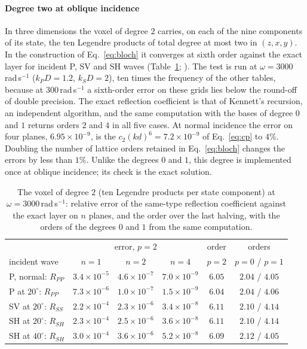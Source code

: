 \documentclass[preprint,review,12pt]{elsarticle}
\begin{document}
\paragraph{Degree two at oblique incidence} In three dimensions the voxel of degree $2$ carries, on each
of the nine components of its state, the ten Legendre products of total degree at most two in
$(z,x,y)$. In the construction of Eq.~\eqref{eq:bloch} it converges at sixth order against the exact
layer for incident P, SV and SH waves (Table~\ref{tab:deg2}; ).
The test is run at $\omega=3000$\,rad\,s$^{-1}$ ($k_PD=1.2$, $k_SD=2$), ten times the frequency of the
other tables, because at $300$\,rad\,s$^{-1}$ a sixth-order error on these grids lies below the round-off
of double precision. The exact reflection coefficient is that of Kennett's recursion, an independent
algorithm, and the same computation with the bases of degree $0$ and $1$ returns orders $2$ and $4$ in
all five cases. At normal incidence the error on four planes, $6.95\times10^{-9}$, is the
$c_2(kd)^6=7.2\times10^{-9}$ of Eq.~\eqref{eq:cp} to $4\%$. Doubling the number of lattice orders retained
in Eq.~\eqref{eq:bloch} changes the errors by less than $1\%$. Unlike the degrees $0$ and $1$, this degree
is implemented once at oblique incidence; its check is the exact solution.
\begin{table}[htbp]
\centering
\caption{The voxel of degree $2$ (ten Legendre products per state component) at
$\omega=3000$\,rad\,s$^{-1}$: relative error of the same-type reflection coefficient against the exact
layer on $n$ planes, and the order over the last halving, with the orders of the degrees $0$ and $1$ from
the same computation.}\label{tab:deg2}
\small
\begin{tabular}{@{}lccccc@{}}
\toprule
 & \multicolumn{3}{c}{error, $p=2$} & order & orders \\
incident wave & $n=1$ & $n=2$ & $n=4$ & $p=2$ & $p=0$ / $p=1$ \\
\midrule
P, normal: $R_{PP}$ & $3.4\times10^{-5}$ & $4.6\times10^{-7}$ & $7.0\times10^{-9}$ & $6.05$ & $2.04$ / $4.05$ \\
P at $20^\circ$: $R_{PP}$ & $7.3\times10^{-6}$ & $1.0\times10^{-7}$ & $1.5\times10^{-9}$ & $6.04$ & $2.04$ / $4.06$ \\
SV at $20^\circ$: $R_{SS}$ & $2.2\times10^{-4}$ & $2.3\times10^{-6}$ & $3.4\times10^{-8}$ & $6.11$ & $2.10$ / $4.14$ \\
SH at $20^\circ$: $R_{SH}$ & $2.3\times10^{-4}$ & $2.5\times10^{-6}$ & $3.6\times10^{-8}$ & $6.11$ & $2.10$ / $4.14$ \\
SH at $40^\circ$: $R_{SH}$ & $3.0\times10^{-4}$ & $3.6\times10^{-6}$ & $5.2\times10^{-8}$ & $6.09$ & $2.12$ / $4.05$ \\
\bottomrule
\end{tabular}
\end{table}
\end{document}
